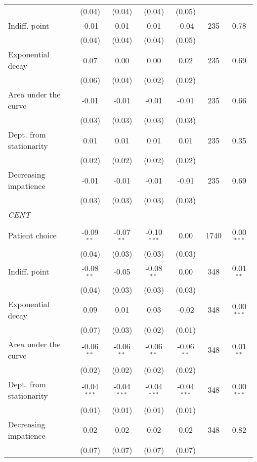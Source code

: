 {\begin{tabular}{l*{6}{c}}
          &   (0.04)&   (0.04)&   (0.04)&   (0.05)&         &         \\
Indiff. point&    -0.01&     0.01&     0.01&    -0.04&      235&     0.78\\
          &   (0.04)&   (0.04)&   (0.04)&   (0.05)&         &         \\
Exponential decay&     0.07&     0.00&     0.00&     0.02&      235&     0.69\\
          &   (0.06)&   (0.04)&   (0.02)&   (0.02)&         &         \\
Area under the curve&    -0.01&    -0.01&    -0.01&    -0.01&      235&     0.66\\
          &   (0.03)&   (0.03)&   (0.03)&   (0.03)&         &         \\
Dept. from stationarity&     0.01&     0.01&     0.01&     0.01&      235&     0.35\\
          &   (0.02)&   (0.02)&   (0.02)&   (0.02)&         &         \\
Decreasing impatience&    -0.01&    -0.01&    -0.01&    -0.01&      235&     0.69\\
          &   (0.03)&   (0.03)&   (0.03)&   (0.03)&         &         \\
\textit{CENT}&         &         &         &         &         &         \\
          &         &         &         &         &         &         \\
Patient choice&-0.09$^{**}$&-0.07$^{**}$&-0.10$^{***}$&     0.00&     1740&0.00$^{***}$\\
          &   (0.04)&   (0.03)&   (0.03)&   (0.03)&         &         \\
Indiff. point&-0.08$^{**}$&    -0.05&-0.08$^{**}$&     0.00&      348&0.01$^{**}$\\
          &   (0.04)&   (0.03)&   (0.03)&   (0.03)&         &         \\
Exponential decay&     0.09&     0.01&     0.03&    -0.02&      348&0.00$^{***}$\\
          &   (0.07)&   (0.03)&   (0.02)&   (0.01)&         &         \\
Area under the curve&-0.06$^{**}$&-0.06$^{**}$&-0.06$^{**}$&-0.06$^{**}$&      348&0.01$^{**}$\\
          &   (0.02)&   (0.02)&   (0.02)&   (0.02)&         &         \\
Dept. from stationarity&-0.04$^{***}$&-0.04$^{***}$&-0.04$^{***}$&-0.04$^{***}$&      348&0.00$^{***}$\\
          &   (0.01)&   (0.01)&   (0.01)&   (0.01)&         &         \\
Decreasing impatience&     0.02&     0.02&     0.02&     0.02&      348&     0.82\\
          &   (0.07)&   (0.07)&   (0.07)&   (0.07)&         &         \\
\bottomrule
\end{tabular}
}
